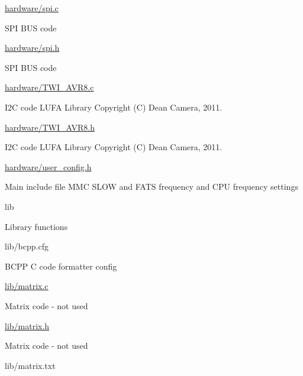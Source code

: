 {\begin{DoxyItemize}
\begin{DoxyItemize}
\item \hyperlink{spi_8c}{hardware/spi.\+c}
\begin{DoxyItemize}
\item S\+PI B\+US code
\end{DoxyItemize}
\item \hyperlink{spi_8h}{hardware/spi.\+h}
\begin{DoxyItemize}
\item S\+PI B\+US code
\end{DoxyItemize}
\item \hyperlink{TWI__AVR8_8c}{hardware/\+T\+W\+I\+\_\+\+A\+V\+R8.\+c}
\begin{DoxyItemize}
\item I2C code L\+U\+FA Library Copyright (C) Dean Camera, 2011.
\end{DoxyItemize}
\item \hyperlink{TWI__AVR8_8h}{hardware/\+T\+W\+I\+\_\+\+A\+V\+R8.\+h}
\begin{DoxyItemize}
\item I2C code L\+U\+FA Library Copyright (C) Dean Camera, 2011.
\end{DoxyItemize}
\item \hyperlink{user__config_8h}{hardware/user\+\_\+config.\+h}
\begin{DoxyItemize}
\item Main include file M\+MC S\+L\+OW and F\+A\+TS frequency and C\+PU frequency settings
\end{DoxyItemize}
\end{DoxyItemize}
\item lib
\begin{DoxyItemize}
\item Library functions
\item lib/bcpp.\+cfg
\begin{DoxyItemize}
\item B\+C\+PP C code formatter config
\end{DoxyItemize}
\item \hyperlink{matrix_8c}{lib/matrix.\+c}
\begin{DoxyItemize}
\item Matrix code -\/ not used
\end{DoxyItemize}
\item \hyperlink{matrix_8h}{lib/matrix.\+h}
\begin{DoxyItemize}
\item Matrix code -\/ not used
\end{DoxyItemize}
\item lib/matrix.\+txt

\end{DoxyItemize}
\end{DoxyItemize}}
